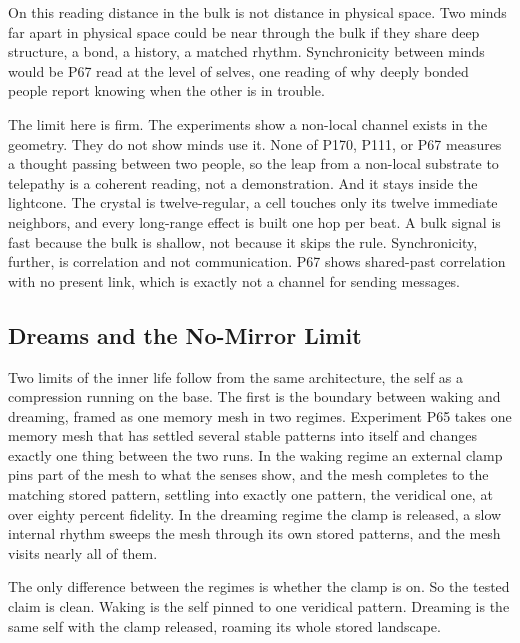 On this reading distance in the bulk is not distance in physical space. Two minds far apart in physical space could be near through the bulk if they share deep structure, a bond, a history, a matched rhythm. Synchronicity between minds would be P67 read at the level of selves, one reading of why deeply bonded people report knowing when the other is in trouble.

The limit here is firm. The experiments show a non-local channel exists in the geometry. They do not show minds use it. None of P170, P111, or P67 measures a thought passing between two people, so the leap from a non-local substrate to telepathy is a coherent reading, not a demonstration. And it stays inside the lightcone. The crystal is twelve-regular, a cell touches only its twelve immediate neighbors, and every long-range effect is built one hop per beat. A bulk signal is fast because the bulk is shallow, not because it skips the rule. Synchronicity, further, is correlation and not communication. P67 shows shared-past correlation with no present link, which is exactly not a channel for sending messages.

\subsection{Dreams and the No-Mirror Limit}

Two limits of the inner life follow from the same architecture, the self as a compression running on the base. The first is the boundary between waking and dreaming, framed as one memory mesh in two regimes. Experiment P65 takes one memory mesh that has settled several stable patterns into itself and changes exactly one thing between the two runs. In the waking regime an external clamp pins part of the mesh to what the senses show, and the mesh completes to the matching stored pattern, settling into exactly one pattern, the veridical one, at over eighty percent fidelity. In the dreaming regime the clamp is released, a slow internal rhythm sweeps the mesh through its own stored patterns, and the mesh visits nearly all of them.

The only difference between the regimes is whether the clamp is on. So the tested claim is clean. Waking is the self pinned to one veridical pattern. Dreaming is the same self with the clamp released, roaming its whole stored landscape.

